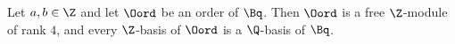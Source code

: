 Let $a,b\in\Z$ and let $\Oord$ be an order of $\Bq$. Then $\Oord$ is a free $\Z$-module of rank $4$, and every $\Z$-basis of $\Oord$ is a
$\Q$-basis of $\Bq$.

